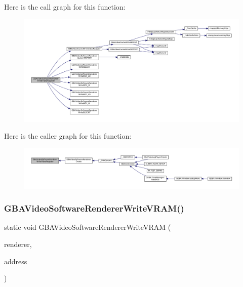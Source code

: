Here is the call graph for this function\+:
\nopagebreak
\begin{figure}[H]
\begin{center}
\leavevmode
\includegraphics[width=350pt]{video-software_8c_abf56bee96b521193690fc647929cd43b_cgraph}
\end{center}
\end{figure}
Here is the caller graph for this function\+:
\nopagebreak
\begin{figure}[H]
\begin{center}
\leavevmode
\includegraphics[width=350pt]{video-software_8c_abf56bee96b521193690fc647929cd43b_icgraph}
\end{center}
\end{figure}
\mbox{\label{video-software_8c_aa5af01915ee7706cdbf55fd4295192f6}} 
\subsubsection{\texorpdfstring{G\+B\+A\+Video\+Software\+Renderer\+Write\+V\+R\+A\+M()}{GBAVideoSoftwareRendererWriteVRAM()}}
{\footnotesize\ttfamily static void G\+B\+A\+Video\+Software\+Renderer\+Write\+V\+R\+AM (\begin{DoxyParamCaption}\item[{struct G\+B\+A\+Video\+Renderer $\ast$}]{renderer,  }\item[{uint32\+\_\+t}]{address }\end{DoxyParamCaption})\hspace{0.3cm}{\ttfamily [static]}}

